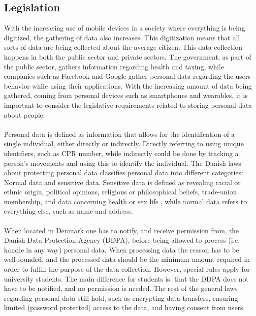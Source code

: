 
\subsection{Legislation}
\label{sub:legislation}

With the increasing use of mobile devices in a society where everything is being digitized, the gathering of data also increases. This digitization means that all sorts of data are being collected about the average citizen. This data collection happens in both the public sector and private sectors. The government, as part of the public sector, gathers information regarding health and taxing, while companies such as Facebook and Google gather personal data regarding the users behavior while using their applications. With the increasing amount of data being gathered, coming from personal devices such as smartphones and wearables, it is important to consider the legislative requirements related to storing personal data about people.
\\\\
Personal data is defined as information that allows for the identification of a single individual, either directly or indirectly. Directly referring to using unique identifiers, such as CPR number, while indirectly could be done by tracking a person's movements and using this to identify the individual. The Danish laws about protecting personal data classifies personal data into different categories: Normal data and sensitive data. Sensitive data is defined as revealing racial or ethnic origin, political opinions, religious or philosophical beliefs, trade-union membership, and data concerning health or sex life \parencite{datatilsynet_stud1}, while normal data refers to everything else, such as name and address.
\\\\
When located in Denmark one has to notify, and receive permission from, the Danish Data Protection Agency (DDPA), before being allowed to process (i.e. handle in any way) personal data. When processing data the reason has to be well-founded, and the processed data should be the minimum amount required in order to fulfill the purpose of the data collection. However, special rules apply for university students. The main difference for students is, that the DDPA does not have to be notified, and no permission is needed. The rest of the general laws regarding personal data still hold, such as encrypting data transfers, ensuring limited (password protected) access to the data, and having consent from users. 
